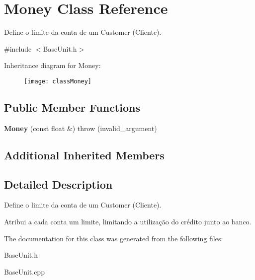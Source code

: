 \hypertarget{classMoney}{\section{Money Class Reference}
\label{classMoney}
}


Define o limite da conta de um Customer (Cliente).  




{\ttfamily \#include $<$Base\-Unit.\-h$>$}

Inheritance diagram for Money\-:\begin{figure}[H]
\begin{center}
\leavevmode
\texttt{[image: classMoney]}
\end{center}
\end{figure}
\subsection*{Public Member Functions}
\begin{DoxyCompactItemize}
\item 
\hypertarget{classMoney_a33986736e7432883ebd61584815b6681}{{\bfseries Money} (const float \&)  throw (invalid\-\_\-argument)}\label{classMoney_a33986736e7432883ebd61584815b6681}

\end{DoxyCompactItemize}
\subsection*{Additional Inherited Members}


\subsection{Detailed Description}
Define o limite da conta de um Customer (Cliente). 

Atribui a cada conta um limite, limitando a utilização do crédito junto ao banco. 

The documentation for this class was generated from the following files\-:\begin{DoxyCompactItemize}
\item 
Base\-Unit.\-h\item 
Base\-Unit.\-cpp\end{DoxyCompactItemize}
